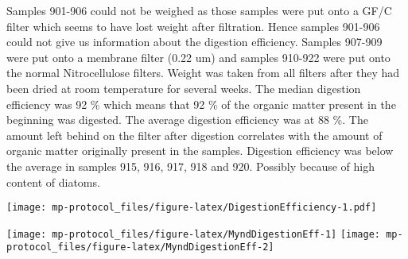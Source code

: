 \documentclass[
  icelandic,
]{book}
\begin{document}
Samples 901-906 could not be weighed as those samples were put onto a GF/C filter which seems to have lost weight after filtration. Hence samples 901-906 could not give us information about the digestion efficiency.
Samples 907-909 were put onto a membrane filter (0.22 um) and samples 910-922 were put onto the normal Nitrocellulose filters. Weight was taken from all filters after they had been dried at room temperature for several weeks.
The median digestion efficiency was 92 \% which means that 92 \% of the organic matter present in the beginning was digested. The average digestion efficiency was at 88 \%.
The amount left behind on the filter after digestion correlates with the amount of organic matter originally present in the samples.
Digestion efficiency was below the average in samples 915, 916, 917, 918 and 920. Possibly because of high content of diatoms.

\texttt{[image: mp-protocol\_files/figure-latex/DigestionEfficiency-1.pdf]}

\texttt{[image: mp-protocol\_files/figure-latex/MyndDigestionEff-1]} \texttt{[image: mp-protocol\_files/figure-latex/MyndDigestionEff-2]}

  
\end{document}
